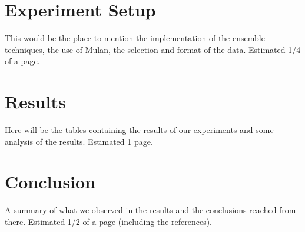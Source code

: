 \documentclass{acm_proc_article-sp}
\begin{document}


\section{Experiment Setup}
This would be the place to mention the implementation of the ensemble
techniques, the use of Mulan, the selection and format of the data. Estimated
1/4 of a page.

\section{Results}
Here will be the tables containing the results of our experiments and some
analysis of the results. Estimated 1 page.




\section{Conclusion}
A summary of what we observed in the results and the conclusions reached from
there. Estimated 1/2 of a page (including the references).



\balancecolumns
\end{document}
